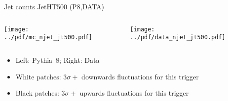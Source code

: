 \documentclass[9pt]{beamer}
\begin{document}
\begin{frame}[t]{Jet counts JetHT500 (P8,DATA)}
\begin{columns}[T]
  \begin{column}{.5\textwidth}
  \texttt{[image: ../pdf/mc\_njet\_jt500.pdf]}
  \end{column}
  \begin{column}{.5\textwidth}
  \texttt{[image: ../pdf/data\_njet\_jt500.pdf]}
  \end{column}
\end{columns}
\begin{itemize}
 \item Left: Pythia~8; Right: Data
 \item White patches: $3\sigma+$ downwards fluctuations for this trigger
 \item Black patches: $3\sigma+$ upwards fluctuations for this trigger
\end{itemize}
\end{frame}
\end{document}
